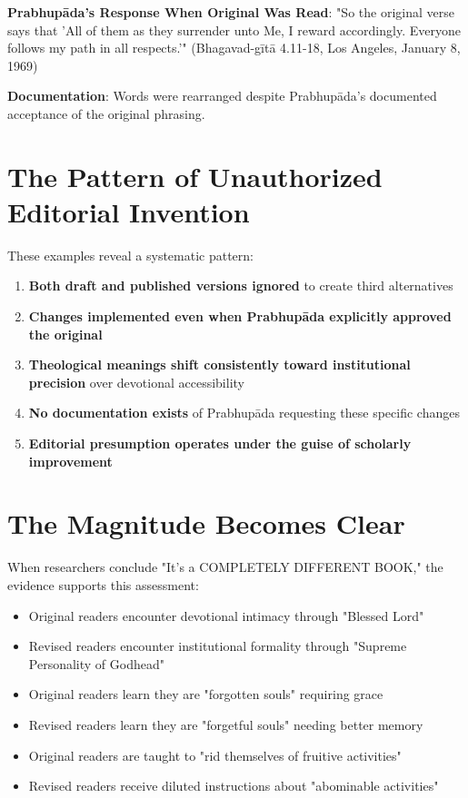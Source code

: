 \documentclass[11pt,twoside]{book}
\begin{document}
\textbf{\textbf{Prabhupāda's Response When Original Was Read}}: "So the original verse says that 'All of them as they surrender unto Me, I reward accordingly. Everyone follows my path in all respects.'" (Bhagavad-gītā 4.11-18, Los Angeles, January 8, 1969)

\textbf{\textbf{Documentation}}: Words were rearranged despite Prabhupāda's documented acceptance of the original phrasing.
\section*{The Pattern of Unauthorized Editorial Invention}
\label{sec:org397e20b}

These examples reveal a systematic pattern:
\begin{enumerate}
\item \textbf{\textbf{Both draft and published versions ignored}} to create third alternatives
\item \textbf{\textbf{Changes implemented even when Prabhupāda explicitly approved the original}}
\item \textbf{\textbf{Theological meanings shift consistently toward institutional precision}} over devotional accessibility
\item \textbf{\textbf{No documentation exists}} of Prabhupāda requesting these specific changes
\item \textbf{\textbf{Editorial presumption operates under the guise of scholarly improvement}}
\end{enumerate}
\section*{The Magnitude Becomes Clear}
\label{sec:org33ef8f7}

When researchers conclude "It's a COMPLETELY DIFFERENT BOOK," the evidence supports this assessment:

\begin{itemize}
\item Original readers encounter devotional intimacy through "Blessed Lord"
\item Revised readers encounter institutional formality through "Supreme Personality of Godhead"
\item Original readers learn they are "forgotten souls" requiring grace
\item Revised readers learn they are "forgetful souls" needing better memory
\item Original readers are taught to "rid themselves of fruitive activities"
\item Revised readers receive diluted instructions about "abominable activities"
\end{itemize}
\end{document}
